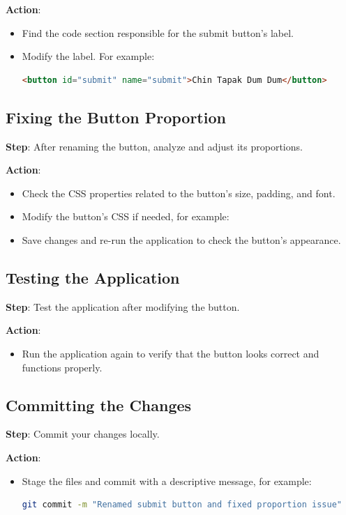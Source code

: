 \documentclass{article}
\begin{document}
\textbf{Action}:
\begin{itemize}
    \item Find the code section responsible for the submit button's label.
    \item Modify the label. For example:
    \begin{lstlisting}[language=HTML]
    <button id="submit" name="submit">Chin Tapak Dum Dum</button>
    \end{lstlisting}
\end{itemize}

\subsection{Fixing the Button Proportion}
\textbf{Step}: After renaming the button, analyze and adjust its proportions.

\textbf{Action}:
\begin{itemize}
    \item Check the CSS properties related to the button's size, padding, and font.
    \item Modify the button’s CSS if needed, for example:
    \item Save changes and re-run the application to check the button's appearance.
\end{itemize}

\subsection{Testing the Application}
\textbf{Step}: Test the application after modifying the button.

\textbf{Action}: 
\begin{itemize}
    \item Run the application again to verify that the button looks correct and functions properly.
\end{itemize}

\subsection{Committing the Changes}
\textbf{Step}: Commit your changes locally.

\textbf{Action}:
\begin{itemize}
    \item Stage the files and commit with a descriptive message, for example:
    \begin{lstlisting}[language=bash]
    git commit -m "Renamed submit button and fixed proportion issue"
    \end{lstlisting}
\end{itemize}
\end{document}

